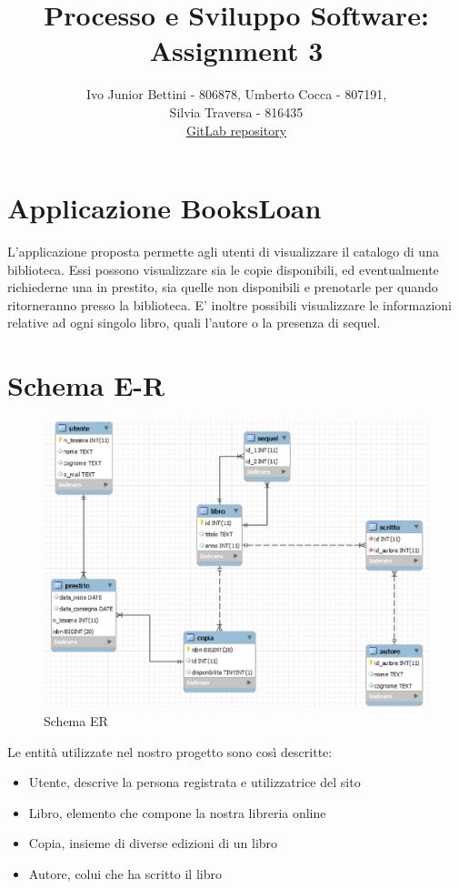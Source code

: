 \documentclass[a4paper,10pt]{article}
\title{Processo e Sviluppo Software: Assignment 3}
\author{Ivo Junior Bettini - 806878, Umberto Cocca - 807191, \\Silvia Traversa - 816435\\
\href{https://gitlab.com/s.traversa/2019_assignment3_booksloan}{GitLab repository}}
\date{}
\begin{document}
\maketitle 


\section*{Applicazione BooksLoan}
L'applicazione proposta permette agli utenti di visualizzare il catalogo di una biblioteca. Essi possono visualizzare sia le copie disponibili, ed eventualmente richiederne una in prestito, sia quelle non disponibili e prenotarle per quando ritorneranno presso la biblioteca.
E' inoltre possibili visualizzare le informazioni relative ad ogni singolo libro, quali l'autore o la presenza di sequel. 

\section*{Schema E-R}

\begin{figure}[H]
	\centering
	\includegraphics[width=0.7\linewidth]{images/ERdiagram}
	\caption[Schema ER]{Schema ER}
	\label{fig:re}
\end{figure}

Le entità utilizzate nel nostro progetto sono così descritte:

\begin{itemize}
	\item Utente, descrive la persona registrata e utilizzatrice del sito
	\item Libro, elemento che compone la nostra libreria online
	\item Copia, insieme di diverse edizioni di un libro
	\item Autore, colui che ha scritto il libro
\end{itemize}
\end{document}
